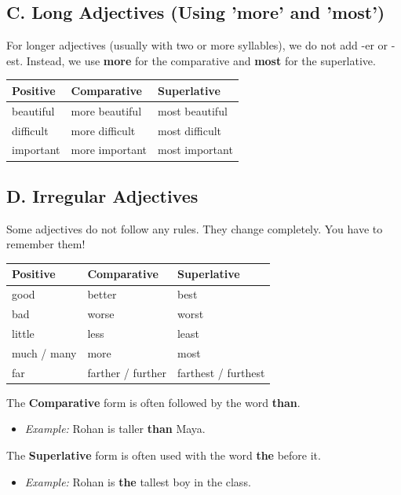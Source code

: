 \subsection*{C. Long Adjectives (Using 'more' and 'most')}
For longer adjectives (usually with two or more syllables), we do not add -er or -est. Instead, we use \textbf{more} for the comparative and \textbf{most} for the superlative.

\begin{table}[h!]
\centering
\begin{tabular}{|l|l|l|}
\hline
\textbf{Positive} & \textbf{Comparative} & \textbf{Superlative} \\
\hline
beautiful & more beautiful & most beautiful \\
difficult & more difficult & most difficult \\
important & more important & most important \\
\hline
\end{tabular}
\end{table}

\subsection*{D. Irregular Adjectives}
Some adjectives do not follow any rules. They change completely. You have to remember them!

\begin{table}[h!]
\centering
\begin{tabular}{|l|l|l|}
\hline
\textbf{Positive} & \textbf{Comparative} & \textbf{Superlative} \\
\hline
good & better & best \\
bad & worse & worst \\
little & less & least \\
much / many & more & most \\
far & farther / further & farthest / furthest \\
\hline
\end{tabular}
\end{table}

\begin{rememberbox}
    The \textbf{Comparative} form is often followed by the word \textbf{than}.
    \begin{itemize}
        \item \textit{Example:} Rohan is taller \textbf{than} Maya.
    \end{itemize}
    The \textbf{Superlative} form is often used with the word \textbf{the} before it.
    \begin{itemize}
        \item \textit{Example:} Rohan is \textbf{the} tallest boy in the class.
    \end{itemize}
\end{rememberbox}

